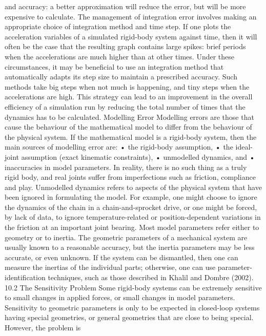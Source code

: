 and accuracy: a better approximation will reduce the error, but will be more expensive to calculate. The management of integration error involves making an appropriate choice of integration method and time step. If one plots the acceleration variables of a simulated rigid-body system against time, then it will often be the case that the resulting graph contains large spikes: brief periods when the accelerations are much higher than at other times. Under these circumstances, it may be beneficial to use an integration method that automatically adapts its step size to maintain a prescribed accuracy. Such methods take big steps when not much is happening, and tiny steps when the accelerations are high. This strategy can lead to an improvement in the overall efficiency of a simulation run by reducing the total number of times that the dynamics has to be calculated. Modelling Error Modelling errors are those that cause the behaviour of the mathematical model to differ from the behaviour of the physical system. If the mathematical model is a rigid-body system, then the main sources of modelling error are: • the rigid-body assumption, • the ideal-joint assumption (exact kinematic constraints), • unmodelled dynamics, and • inaccuracies in model parameters. In reality, there is no such thing as a truly rigid body, and real joints suffer from imperfections such as friction, compliance and play. Unmodelled dynamics refers to aspects of the physical system that have been ignored in formulating the model. For example, one might choose to ignore the dynamics of the chain in a chain-and-sprocket drive, or one might be forced, by lack of data, to ignore temperature-related or position-dependent variations in the friction at an important joint bearing. Most model parameters refer either to geometry or to inertia. The geometric parameters of a mechanical system are usually known to a reasonable accuracy, but the inertia parameters may be less accurate, or even unknown. If the system can be dismantled, then one can measure the inertias of the individual parts; otherwise, one can use parameter-identification techniques, such as those described in Khalil and Dombre (2002). 10.2 The Sensitivity Problem Some rigid-body systems can be extremely sensitive to small changes in applied forces, or small changes in model parameters. Sensitivity to geometric parameters is only to be expected in closed-loop systems having special geometries, or general geometries that are close to being special. However, the problem is

